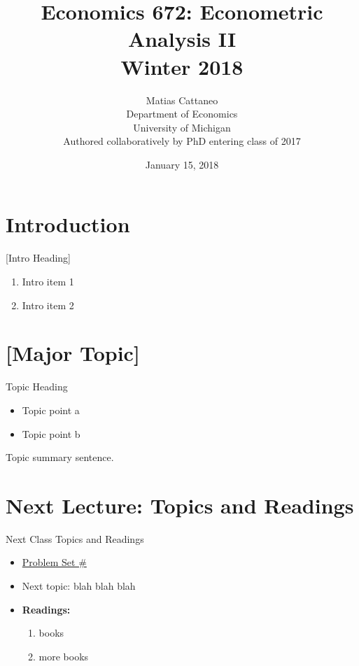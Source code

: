 \documentclass[fleqn, 10pt]{beamer}
\title[Econ-672]{Economics 672: Econometric Analysis II \\ Winter 2018}
\author[M. Cattaneo]{Matias Cattaneo \\
        Department of Economics \\
        University of Michigan \\
        Authored collaboratively by PhD entering class of 2017
        }
\date{January 15, 2018}
\begin{document}


\begin{frame}[plain]
    \titlepage
\end{frame}


\section{Introduction}

\begin{frame}{[Intro Heading]}
    \begin{enumerate}
		\item Intro item 1
		\item Intro item 2
	\end{enumerate}
\end{frame}


\section{[Major Topic]}

\begin{frame}{Topic Heading}

    \begin{itemize}
		\item Topic point a
		\item Topic point b
	\end{itemize}
	Topic summary sentence.
	
\end{frame}


\section{Next Lecture: Topics and Readings}

\begin{frame}{Next Class Topics and Readings}
	
	\begin{itemize}
		\item \underline{Problem Set \#}
		\item Next topic: blah blah blah
		\item \textbf{Readings:}
		\begin{enumerate}
			\item books
			\item more books
		\end{enumerate}
	\end{itemize}
	
\end{frame}
\end{document}
